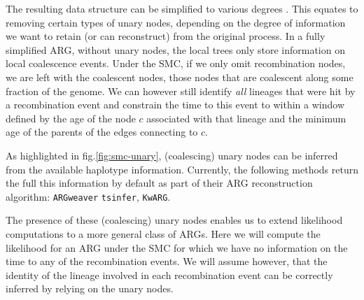 \documentclass{article}
\newcommand{\tsinfer}[0]{\texttt{tsinfer}}
\newcommand{\kwarg}[0]{\texttt{KwARG}}
\newcommand{\argweaver}[0]{\texttt{ARGweaver}}
\begin{document}

The resulting data structure can be simplified to various degrees \citep{Wong-2023}. 
This equates to removing certain types of unary nodes, 
depending on the degree of information 
we want to retain (or can reconstruct) from the original process. 
In a fully simplified ARG, without unary nodes, 
the local trees only store information on local coalescence events.
Under the SMC, if we only omit recombination nodes, %
we are left with the coalescent nodes, those nodes that are coalescent 
along some fraction of the genome. We can however still identify \emph{all} 
lineages that were hit by a recombination event and constrain the time to 
this event to within a window defined by the age of the node $c$ associated with that 
lineage and the minimum age of the parents of the edges connecting to $c$.

As highlighted in fig.\ref{fig:smc-unary}, (coalescing) unary nodes can be inferred 
from the available haplotype information. Currently, the following methods 
return the full this information by default as part of their ARG reconstruction algorithm: 
\argweaver \citep{rasmussen_genome-wide_2014} 
\tsinfer \citep{kelleher_inferring_2019}, 
\kwarg \citep{ignatieva_kwarg_2021}.

The presence of these (coalescing) unary nodes enables us to extend likelihood 
computations to a more general class of ARGs.
Here we will compute the likelihood for an ARG
under the SMC for which we have no information on the time to any 
of the recombination events. 
We will assume however, that the identity 
of the lineage involved in each recombination event can be correctly 
inferred by relying on the unary nodes.
\end{document}
